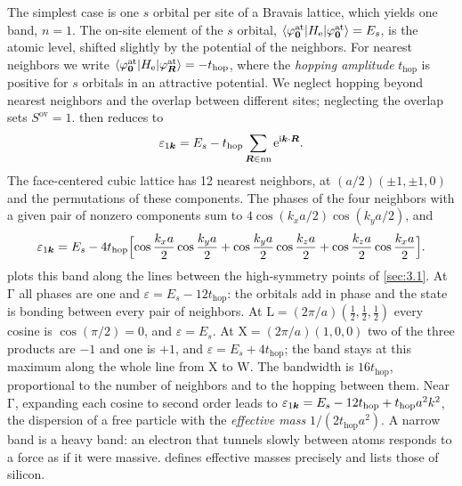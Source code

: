 The simplest case is one $s$ orbital per site of a Bravais lattice, which yields one band, $n = 1$. The on-site element of the $s$ orbital, $\langle\varphi^{\mathrm{at}}_{\bm{0}}|H_{\mathrm{e}}|\varphi^{\mathrm{at}}_{\bm{0}}\rangle = E_s$, is the atomic level, shifted slightly by the potential of the neighbors. For nearest neighbors we write $\langle\varphi^{\mathrm{at}}_{\bm{0}}|H_{\mathrm{e}}|\varphi^{\mathrm{at}}_{\bm{R}}\rangle = -t_{\mathrm{hop}}$, where the \emph{hopping amplitude} $t_{\mathrm{hop}}$ is positive for $s$ orbitals in an attractive potential. We neglect hopping beyond nearest neighbors and the overlap between different sites; neglecting the overlap sets $S^{\mathrm{ov}} = 1$.  then reduces to
\begin{equation}
  \varepsilon_{1\bm{k}} = E_s - t_{\mathrm{hop}}\sum_{\bm{R}\in\mathrm{nn}}\mathrm{e}^{\mathrm{i}\bm{k}\cdot\bm{R}} .
  \label{eq:3.2-TB}
\end{equation}
The face-centered cubic lattice has 12 nearest neighbors, at $(a/2)(\pm1,\pm1,0)$ and the permutations of these components. The phases of the four neighbors with a given pair of nonzero components sum to $4\cos(k_xa/2)\cos(k_ya/2)$, and
\begin{equation}
  \varepsilon_{1\bm{k}} = E_s - 4t_{\mathrm{hop}}\Bigl[\cos\frac{k_xa}{2}\cos\frac{k_ya}{2} + \cos\frac{k_ya}{2}\cos\frac{k_za}{2} + \cos\frac{k_za}{2}\cos\frac{k_xa}{2}\Bigr] .
  \label{eq:3.2-fcc}
\end{equation}
 plots this band along the lines between the high-symmetry points of \cref{sec:3.1}. At $\mathrm{\Gamma}$ all phases are one and $\varepsilon = E_s - 12t_{\mathrm{hop}}$: the orbitals add in phase and the state is bonding between every pair of neighbors. At $\mathrm{L} = (2\pi/a)(\tfrac12,\tfrac12,\tfrac12)$ every cosine is $\cos(\pi/2) = 0$, and $\varepsilon = E_s$. At $\mathrm{X} = (2\pi/a)(1,0,0)$ two of the three products are $-1$ and one is $+1$, and $\varepsilon = E_s + 4t_{\mathrm{hop}}$; the band stays at this maximum along the whole line from $\mathrm{X}$ to $\mathrm{W}$. The bandwidth is $16t_{\mathrm{hop}}$, proportional to the number of neighbors and to the hopping between them. Near $\mathrm{\Gamma}$, expanding each cosine to second order leads to $\varepsilon_{1\bm{k}} = E_s - 12t_{\mathrm{hop}} + t_{\mathrm{hop}}a^2k^2$, the dispersion of a free particle with the \emph{effective mass} $1/(2t_{\mathrm{hop}}a^2)$. A narrow band is a heavy band: an electron that tunnels slowly between atoms responds to a force as if it were massive.  defines effective masses precisely and lists those of silicon.

